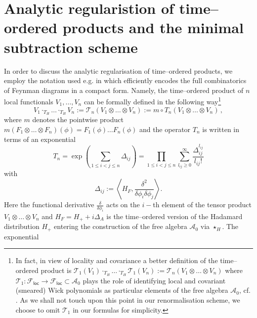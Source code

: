 \documentclass[10pt]{book}
\newcommand{\loc}{\mathsf{loc}}
\newcommand{\Acal}{\mathcal{A}}
\newcommand{\Fcal}{\mathcal{F}}
\theoremstyle{break}
\begin{document}
\section{Analytic regularistion of time--ordered products and the minimal subtraction scheme}


In order to discuss the analytic regularisation of time--ordered products, we employ the notation used e.g. in %
which efficiently encodes the full combinatorics of Feynman diagrams in a compact form. Namely, the time--ordered product of $n$ local functionals $V_1, \dots, V_n$ can be formally defined in the following way\footnote{%
In fact, in view of locality and covariance a better definition of the time--ordered product is $\mathcal{T}_1(V_1)\cdot_{T_H}  \dots \cdot_{T_H}    \mathcal{T}_1(V_n)    
:=
\mathcal{T}_n(V_1\otimes \dots \otimes V_n) $ where $\mathcal{T}_1:\Fcal_\loc\to\Fcal_\loc\subset\Acal_0$ plays the role of identifying local and covariant (smeared) Wick polynomials as particular elements of the free algebra $\Acal_0$, cf. %
. As we shall not touch upon this point in our renormalisation scheme, we choose to omit $\mathcal{T}_1$ in our formulas for simplicity.}
\begin{equation*}
V_1\cdot_{T_H}  \dots \cdot_{T_H}    V_n    
:=
\mathcal{T}_n(V_1\otimes \dots \otimes V_n) 
:=  m \circ T_n (V_1\otimes \dots \otimes V_n)\,,
\end{equation*}
where $m$ denotes the pointwise product $m(F_1\otimes \dots \otimes F_n)(\phi) = F_1(\phi)\dots F_n(\phi)$
and the operator $T_n$ is written in terms of an exponential 
%
\begin{equation*} 
T_n = \exp\left(\sum_{1\leq i<j \leq n}\Delta_{ij}\right)= \prod_{1\leq i<j\leq n} \sum_{l_{ij} \geq 0}^\infty  \frac{\Delta_{ij}^{l_{ij}}}{l_{ij}!}
\end{equation*}
%
with
%
\begin{equation*}
\Delta_{ij} :=   \left\langle H_F, \frac{\delta^2}{\delta \phi_i \delta \phi_j} \right\rangle.
\end{equation*}
%
Here the functional derivative $\frac{\delta}{\delta \phi_i}$ acts on the $i-$th element of the tensor product 
$V_1\otimes \dots \otimes V_n$ and $H_F=H_++i\Delta_A$ is the time--ordered version of the Hadamard distribution $H_+$ entering the construction of the free algebra $\Acal_0$ via $\star_H$.
The exponential %
\end{document}
